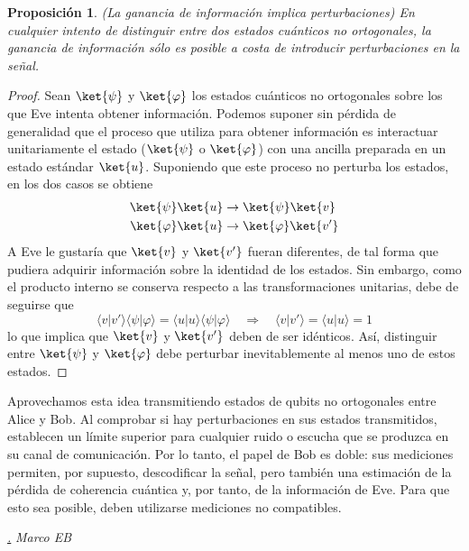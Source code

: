 \documentclass[a4paper,11pt]{book} %
\newtheorem{proposicion_contador}{Proposición}
\newcommand{\Proposicion}[1]{
		\begin{mybox_gray2}{}
			\begin{proposicion_contador}
				 #1 
			\end{proposicion_contador} 
		\end{mybox_gray2}
	}
\numberwithin{equation}{chapter}
\newcommand{\braket}[2]{\langle #1|#2\rangle}
\def\rqa{\quad \Rightarrow \quad}
\def\subsubiContadorIt{\par\addtocounter{subsubsection}{1}\underline{\it\thesubsubsection.}\hskip0.5cm \setcounter{subsubsubsectionIt}{0}}
\newcommand{\SubsubiIt}[1]{
		\subsubiContadorIt \textit{#1}
	}
\newcounter{subsubsubsectionIt}[subsubsection]
\begin{document}
	\Proposicion{
	\textit{(La ganancia de información implica perturbaciones)} En cualquier intento de distinguir entre dos estados cuánticos no ortogonales, la ganancia de información sólo es posible a costa de introducir perturbaciones en la señal.
	}

	\begin{proof}
	Sean $\ket{\psi}$ y $\ket{\varphi}$ los estados cuánticos no ortogonales sobre los que Eve intenta obtener información. Podemos suponer sin pérdida de generalidad que el proceso que utiliza para obtener información es interactuar unitariamente el estado ($\ket{\psi}$ o $\ket{\varphi}$) con una ancilla preparada en un estado estándar $\ket{u}$. Suponiendo que este proceso no perturba los estados, en los dos casos se obtiene
	\begin{equation} 
\begin{aligned}
	\ket{\psi} \ket{u} & \rightarrow \ket{\psi} \ket{v} \\
	\ket{\varphi} \ket{u} & \rightarrow \ket{\varphi} \ket{v'}
	\end{aligned}
\end{equation}
	A Eve le gustaría que $\ket{v}$ y $\ket{v'}$ fueran diferentes, de tal forma que pudiera adquirir información sobre la identidad de los estados. Sin embargo, como el producto interno se conserva respecto a las transformaciones unitarias, debe de seguirse que
	\begin{equation}
	\braket{v}{v'} \braket{\psi}{\varphi} = \braket{u}{u} \braket{\psi}{\varphi} \rqa \braket{v}{v'} = \braket{u}{u} = 1	
	\end{equation}
	lo que implica que $\ket{v}$ y $\ket{v'}$ deben de ser idénticos. Así, distinguir entre $\ket{\psi}$ y $\ket{\varphi}$ debe perturbar inevitablemente al menos uno de estos estados.
	\end{proof}
Aprovechamos esta idea transmitiendo estados de qubits no ortogonales entre Alice y Bob. Al comprobar si hay perturbaciones en sus estados transmitidos, establecen un límite superior para cualquier ruido o escucha que se produzca en su canal de comunicación. Por lo tanto, el papel de Bob es doble: sus mediciones permiten, por supuesto, descodificar la señal, pero también una estimación de la pérdida de coherencia cuántica y, por tanto, de la información de Eve. Para que esto sea posible, deben utilizarse mediciones no compatibles.

			\SubsubiIt{Marco EB}
\end{document}
